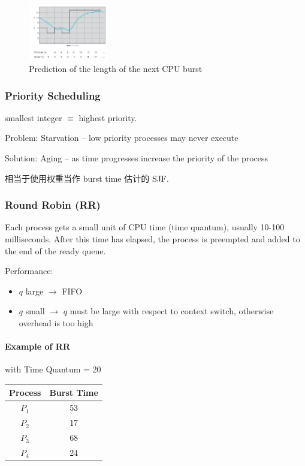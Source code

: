 \begin{figure}[!htb]
    \centering
    \includegraphics[width=0.309\textwidth]{pic/OS5/Prediction of the length of the next CPU burst}
    \caption{Prediction of the length of the next CPU burst}
\end{figure}


\subsubsection{Priority Scheduling}
smallest integer $\equiv$ highest priority. 

Problem: Starvation – low priority processes may never execute

Solution: Aging – as time progresses increase the priority of the process

相当于使用权重当作 burst time 估计的 SJF. 

\subsubsection{Round Robin (RR)}
Each process gets a small unit of CPU time (time quantum), usually 10-100 milliseconds. After this time has elapsed, the
process is preempted and added to the end of the ready queue. 

Performance:
\begin{itemize}
    \item $q$ large $\to$ FIFO
    \item $q$ small $\to$ $q$ must be large with respect to context switch,
    otherwise overhead is too high
\end{itemize}

\paragraph{Example of RR} with Time Quantum = 20
\begin{table}[!htb]
    \centering
    \begin{tabular}[c]{cc}\toprule
        Process & Burst Time \\ \midrule
        $P_1$ & 53 \\
        $P_2$ & 17 \\
        $P_3$ & 68 \\
        $P_4$ & 24 \\
        \bottomrule
    \end{tabular}
\end{table}

